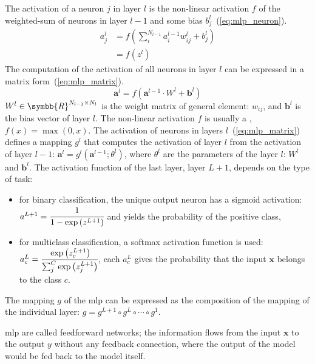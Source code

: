 \documentclass[../main.tex]{subfiles}
\begin{document}
	 The activation of a neuron \(j\) in layer \(l\) is the non-linear activation \(f\) of the weighted-sum of neurons in layer \(l-1\) and some bias \(b_{j}^{l}\)~(\cref{eq:mlp_neuron}).
	 \begin{align}
		 a_{j}^{l} & = f\left(\sum_{i}^{N_{l-1}}a_{i}^{l-1}w_{ij}^{l} + b_{j}^{l} \right) \\ \label{eq:mlp_neuron}
		           & = f\left(z^{l}\right)
	 \end{align}
	 The computation of the activation of all neurons in layer \(l\) can be expressed in a matrix form~(\cref{eq:mlp_matrix}).
	 \begin{equation}
		 \symbf{a}^{l} = f\left( \symbf{a}^{l-1} \cdot W^l + \symbf{b}^{l} \right) \label{eq:mlp_matrix}
	 \end{equation}
	 \(W^l \in \symbb{R}^{N_{l-1} \times N_{l}}\) is the weight matrix of general element: \(w_{ij}\), and \(\symbf{b}^{l}\) is the bias vector of layer \(l\).
	 The non-linear activation \(f\) is usually a , \(f\left(x\right) = \max\left(0, x\right)\).
	 The activation of neurons in layers \(l\)~(\cref{eq:mlp_matrix}) defines a mapping \(g^{l}\) that computes the activation of layer \(l\) from the activation of layer \(l-1\): \( \symbf{a}^{l} = g^{l}\left(\symbf{a}^{l-1}; \theta^{l}\right)\), where \(\theta^{l}\) are the parameters of the layer \(l\): \(W^l\) and \( \symbf{b}^{l}\).
	 The activation function of the last layer, layer \(L+1\), depends on the type of task:
	 \begin{itemize}
		 \item for binary classification, the unique output neuron has a sigmoid activation: \(a^{L+1} = \cfrac{1}{1-\exp\left(z^{L+1}\right)}\) and yields the probability of the positive class,
		 \item for multiclass classification, a softmax activation function is used: \(a_{c}^{L} = \cfrac{\exp\left(z_{c}^{L+1}\right)}{\sum_{j}^{C}\exp\left(z_{j}^{L+1}\right)}\), each \(a_{c}^{L}\) gives the probability that the input \(\symbf{x}\) belongs to the class \(c\).
	 \end{itemize}
	 The mapping \(g\) of the \gls{mlp} can be expressed as the composition of the mapping of the individual layer: \(g = g^{L+1} \circ g^{L} \circ \cdots \circ g^{1}\).

	 \Gls{mlp} are called feedforward networks; the information flows from the input \(\symbf{x}\) to the output \(y\) without any feedback connection, where the output of the model would be fed back to the model itself.
\end{document}
